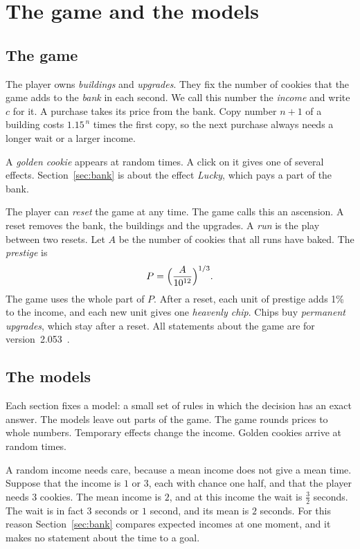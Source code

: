 \documentclass[11pt]{article}
\theoremstyle{boxed}
\begin{document}
\contentsblock

\newpage
\section{The game and the models}\label{sec:intro}

\subsection{The game}

The player owns \emph{buildings} and \emph{upgrades}. They fix the number of cookies that the
game adds to the \emph{bank} in each second. We call this number the \emph{income} and write $c$
for it. A purchase takes its price from the bank. Copy number $n+1$ of a building costs
$1.15^{\,n}$ times the first copy, so the next purchase always needs a longer wait or a larger
income.

A \emph{golden cookie} appears at random times. A click on it gives one of several effects.
Section~\ref{sec:bank} is about the effect \emph{Lucky}, which pays a part of the bank.

The player can \emph{reset} the game at any time. The game calls this an ascension. A reset
removes the bank, the buildings and the upgrades. A \emph{run} is the play between two resets.
Let $A$ be the number of cookies that all runs have baked. The \emph{prestige} is
\begin{equation}\label{eq:prestige}
  P=\Bigl(\frac{A}{10^{12}}\Bigr)^{1/3}.
\end{equation}
The game uses the whole part of $P$. After a reset, each unit of prestige adds 1\% to the
income, and each new unit gives one \emph{heavenly chip}. Chips buy \emph{permanent upgrades},
which stay after a reset. All statements about the game are for version~2.053~\cite{Game}.

\subsection{The models}

Each section fixes a model: a small set of rules in which the decision has an exact answer. The
models leave out parts of the game. The game rounds prices to whole numbers. Temporary effects
change the income. Golden cookies arrive at random times.

A random income needs care, because a mean income does not give a mean time. Suppose that the
income is $1$ or $3$, each with chance one half, and that the player needs $3$ cookies. The mean
income is $2$, and at this income the wait is $\frac32$ seconds. The wait is in fact $3$ seconds
or $1$ second, and its mean is $2$ seconds. For this reason Section~\ref{sec:bank} compares
expected incomes at one moment, and it makes no statement about the time to a goal.
\end{document}
